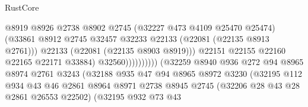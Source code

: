 \begin{lexlean}{RustCore}
\begin{coremodule}
                                                    @8919
                                                    @8926
                                                    @2738
                                                    @8902
                                                    @2745
                                                    (@32227 @473 @4109 @25470 @25474)
                                                    (@33861
                                                      @8912
                                                      @2745
                                                      @32457
                                                      @32233
                                                      @22133
                                                      (@22081 (@22135 @8913 @2761)))
                                                    @22133
                                                    (@22081 (@22135 @8903 @8919)))
                                                  @22151
                                                  @22155
                                                  @22160
                                                  @22165
                                                  @22171
                                                  @33884)
                                                @32560))))))))))
                            (@32259
                              @8940
                              @936
                              @272
                              @94
                              @8965
                              @8974
                              @2761
                              @3243
                              (@32188
                                @935
                                @47
                                @94
                                @8965
                                @8972
                                @3230
                                (@32195
                                  @112
                                  @934
                                  @43
                                  @46
                                  @2861
                                  @8964
                                  @8971
                                  @2738
                                  @8945
                                  @2745
                                  (@32206 @28 @43 @28 @2861 @26553 @22502)
                                  (@32195
                                    @932
                                    @73
                                    @43

\end{coremodule}
\end{lexlean}
